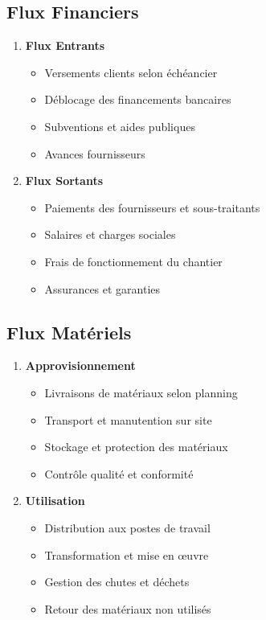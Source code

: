 \subsection{Flux Financiers}

\begin{enumerate}
    \item \textbf{Flux Entrants}
    \begin{itemize}
        \item Versements clients selon échéancier
        \item Déblocage des financements bancaires
        \item Subventions et aides publiques
        \item Avances fournisseurs
    \end{itemize}
    
    \item \textbf{Flux Sortants}
    \begin{itemize}
        \item Paiements des fournisseurs et sous-traitants
        \item Salaires et charges sociales
        \item Frais de fonctionnement du chantier
        \item Assurances et garanties
    \end{itemize}
\end{enumerate}

\subsection{Flux Matériels}

\begin{enumerate}
    \item \textbf{Approvisionnement}
    \begin{itemize}
        \item Livraisons de matériaux selon planning
        \item Transport et manutention sur site
        \item Stockage et protection des matériaux
        \item Contrôle qualité et conformité
    \end{itemize}
    
    \item \textbf{Utilisation}
    \begin{itemize}
        \item Distribution aux postes de travail
        \item Transformation et mise en œuvre
        \item Gestion des chutes et déchets
        \item Retour des matériaux non utilisés
    \end{itemize}
\end{enumerate}

